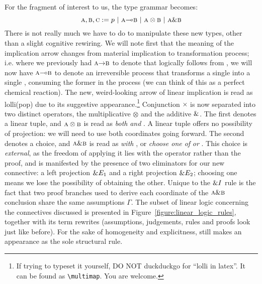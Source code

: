 For the fragment of interest to us, the type grammar becomes:
\begin{equation}
\prop{a}, \prop{b}, \prop{c} := p \ | \ \prop{a} \li \prop{b} \ | \ \prop{a} \otimes \prop{b} \ | \ \prop{a} \with \prop{b} 
\label{equation:ILL}
\end{equation}
There is not really much we have to do to manipulate these new types, other than a slight cognitive rewiring.
We will note first that the meaning of the implication arrow changes from material implication to transformation process; i.e. where we previously had $\smallprop{a} \ii \smallprop{b}$ to denote that  logically follows from , we will now have $\smallprop{a} \li \smallprop{b}$ to denote an irreversible process that transforms a single  into a single , consuming the former in the process (we can think of this as a perfect chemical reaction).
The new, weird-looking arrow of linear implication is read as lolli(pop) due to its suggestive appearance.\footnote{If trying to typeset it yourself, DO NOT duckduckgo for ``lolli in latex''. It can be found as \texttt{\textbackslash multimap}. You are welcome.}
Conjunction $\times$ is now separated into two distinct operators, the multiplicative $\otimes$ and the additive ${\&}$. 
The first denotes a linear tuple, and $\normalfont\textsc{a} \otimes \normalfont\textsc{b}$ is read as \textit{both}  \textit{and} .
A linear tuple offers no possibility of projection: we will need to use both coordinates going forward.
The second denotes a choice, and $\normalfont\textsc{a} {\ensuremath{\&}} \normalfont\textsc{b}$ is read as  \textit{with} , or \textit{choose one of} \textit{or} .
This choice is \textit{external}, as the freedom of applying it lies with the operator rather than the proof, and is manifested by the presence of two eliminators for our new connective: a left projection ${\&} E_1$ and a right projection ${\&} E_2$; choosing one means we lose the possibility of obtaining the other.
Unique to the ${\&} I$ rule is the fact that two proof branches used to derive each coordinate of the $\normalfont\textsc{a} {\ensuremath{\&}} \normalfont\textsc{b}$ conclusion share the same assumptions $\Gamma$.
The subset of linear logic concerning the connectives discussed is presented in Figure~\ref{figure:linear_logic_rules}, together with its term rewrites (assumptions, judgements, rules and proofs look just like before).
For the sake of homogeneity and explicitness, \Exchange{} still makes an appearance as the sole structural rule.

